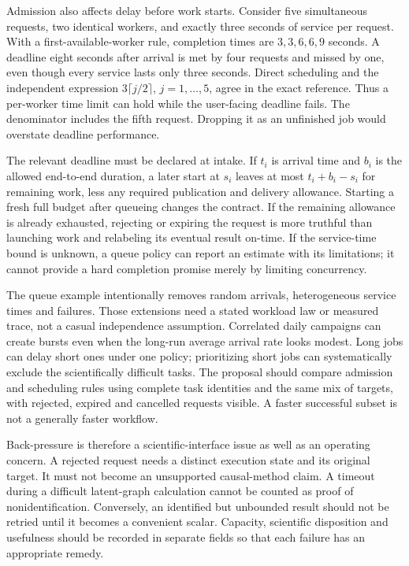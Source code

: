 Admission also affects delay before work starts. Consider five simultaneous
requests, two identical workers, and exactly three seconds of service per
request. With a first-available-worker rule, completion times are
$3,3,6,6,9$ seconds. A deadline eight seconds after arrival is met by four
requests and missed by one, even though every service lasts only three
seconds. Direct scheduling and the independent expression
$3\lceil j/2\rceil$, $j=1,\ldots,5$, agree in the exact reference.
Thus a per-worker time limit can hold while the user-facing deadline fails.
The denominator includes the fifth request. Dropping it as an unfinished
job would overstate deadline performance.

The relevant deadline must be declared at intake. If $t_i$ is arrival time
and $b_i$ is the allowed end-to-end duration, a later start at $s_i$ leaves
at most $t_i+b_i-s_i$ for remaining work, less any required publication and
delivery allowance. Starting a fresh full budget after queueing changes the
contract. If the remaining allowance is already exhausted, rejecting or
expiring the request is more truthful than launching work and relabeling
its eventual result on-time. If the service-time bound is unknown, a queue
policy can report an estimate with its limitations; it cannot provide a
hard completion promise merely by limiting concurrency.

The queue example intentionally removes random arrivals, heterogeneous
service times and failures. Those extensions need a stated workload law or
measured trace, not a casual independence assumption. Correlated daily
campaigns can create bursts even when the long-run average arrival rate
looks modest. Long jobs can delay short ones under one policy; prioritizing
short jobs can systematically exclude the scientifically difficult tasks.
The proposal should compare admission and scheduling rules using complete
task identities and the same mix of targets, with rejected, expired and
cancelled requests visible. A faster successful subset is not a generally
faster workflow.

Back-pressure is therefore a scientific-interface issue as well as an
operating concern. A rejected request needs a distinct execution state and
its original target. It must not become an unsupported causal-method claim.
A timeout during a difficult latent-graph calculation cannot be counted as
proof of nonidentification. Conversely, an identified but unbounded result
should not be retried until it becomes a convenient scalar. Capacity,
scientific disposition and usefulness should be recorded in separate fields
so that each failure has an appropriate remedy.

